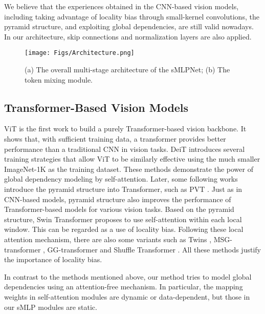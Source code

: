 \documentclass[letterpaper]{article} \usepackage{aaai22}  \usepackage{times}  \usepackage{helvet}  \usepackage{courier}  \usepackage[hyphens]{url}  \usepackage{graphicx} \usepackage{color}
\begin{document}
We believe that the experiences obtained in the CNN-based vision models, including taking advantage of locality bias through small-kernel convolutions, the pyramid structure, and exploiting global dependencies, are still valid nowadays. In our architecture, skip connections \cite{he2016deep} and normalization layers \cite{ioffe2015batch,ba2016layer} are also applied.  

\begin{figure*}[t]
\centering
\texttt{[image: Figs/Architecture.png]} \caption{(a) The overall multi-stage architecture of the sMLPNet; (b) The token mixing module.}
\label{Architecture}
\end{figure*}

\subsection{Transformer-Based Vision Models}
ViT \cite{dosovitskiy2020image} is the first work to build a purely Transformer-based vision backbone. It shows that, with sufficient training data, a transformer provides better performance than a traditional CNN in vision tasks. 
DeiT \cite{touvron2021training} introduces several training strategies that allow ViT to be similarly effective using the much smaller ImageNet-1K as the training dataset. These methods demonstrate the power of global dependency modeling by self-attention. Later, some following works introduce the pyramid structure into Transformer, such as PVT \cite{wang2021pyramid}. Just as in CNN-based models, pyramid structure also improves the performance of Transformer-based models for various vision tasks. Based on the pyramid structure, Swin Transformer \cite{liu2021swin} proposes to use self-attention within each local window. This can be regarded as a use of locality bias. Following these local attention mechanism, there are also some variants such as Twins \cite{chu2021twins}, MSG-transformer \cite{fang2021msg}, GG-transformer \cite{yu2021glance} and Shuffle Transformer \cite{huang2021shuffle}. All these methods justify the importance of locality bias.

In contrast to the methods mentioned above, our method tries to model global dependencies using an attention-free mechanism. In particular, the mapping weights in self-attention modules are dynamic or data-dependent, but those in our sMLP modules are static. 
\end{document}
